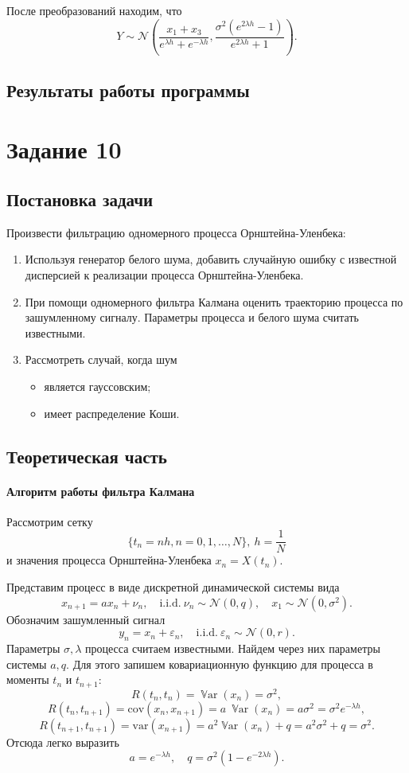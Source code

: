 \documentclass[16pt]{article}
\DeclareMathOperator*{\Var}{\mathbb{V}ar}
\begin{document}
После преобразований находим, что $$Y \sim \mathcal{N}\left(\dfrac{x_1 + x_3}{e^{\lambda h} + e^{-\lambda h}},\dfrac{\sigma^2 (e^{2\lambda h} - 1)}{e^{2\lambda h} + 1}\right).$$
\subsection{Результаты работы программы}

\section{Задание 10}
\subsection{Постановка задачи}
Произвести фильтрацию одномерного процесса Орнштейна-Уленбека:
\begin{enumerate}
	\item Используя генератор белого шума, добавить случайную ошибку с известной дисперсией к реализации процесса Орнштейна-Уленбека.
	\item При помощи одномерного фильтра Калмана оценить траекторию процесса по зашумленному сигналу. Параметры процесса и белого шума считать известными.
	\item Рассмотреть случай, когда шум
	\begin{itemize}
		\item является гауссовским;
		\item имеет распределение Коши.
	\end{itemize}
\end{enumerate}

\subsection{Теоретическая часть}
\paragraph{Алгоритм работы фильтра Калмана}
Рассмотрим сетку $$\{t_n = nh, n = 0, 1, \ldots, N\},\ h = \dfrac1N$$ и значения процесса Орнштейна-Уленбека
$x_n = X(t_n).$

Представим процесс в виде дискретной динамической системы вида
$$x_{n+1} = ax_n + \nu_n, \quad \mathrm{i.i.d.}\ \nu_n \sim \mathcal{N}(0, q), \quad x_1 \sim \mathcal{N}(0, \sigma^2).$$
Обозначим зашумленный сигнал
$$y_n = x_n + \varepsilon_n, \quad \mathrm{i.i.d.}\ \varepsilon_n \sim \mathcal{N}(0, r).$$
Параметры $\sigma, \lambda$ процесса считаем известными. Найдем через них параметры системы $a, q$. Для этого запишем ковариационную функцию для процесса в моменты $t_n$ и $t_{n+1}$:
$$R(t_n, t_n) = \Var(x_n) = \sigma^2,$$
$$R(t_n, t_{n+1}) = \mathrm{cov}(x_n, x_{n+1}) = a\ \Var(x_n) = a\sigma^2 = \sigma^2 e^{-\lambda h},$$
$$R(t_{n+1}, t_{n+1}) = \mathrm{var}(x_{n+1}) = a^2\Var(x_n) + q = a^2\sigma^2 + q = \sigma^2.$$
Отсюда легко выразить
$$a = e^{-\lambda h}, \quad q = \sigma^2(1 - e^{-2\lambda h}).$$
\end{document}
